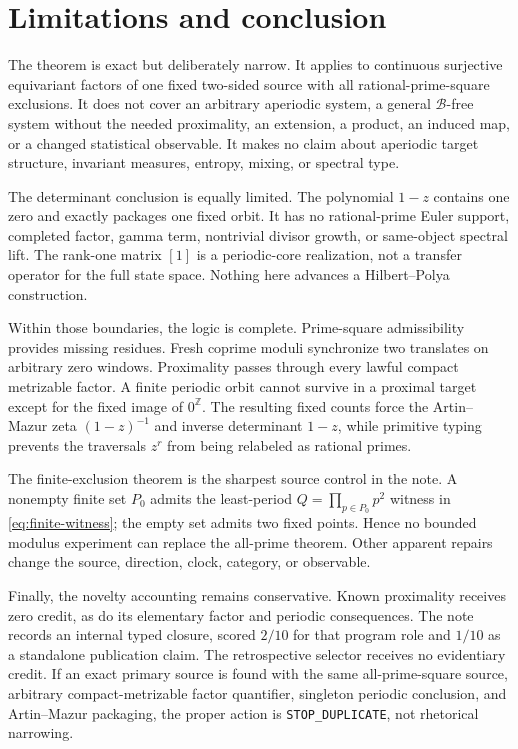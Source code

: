 \section{Limitations and conclusion}
\label{sec:limitations-conclusion}

The theorem is exact but deliberately narrow.  It applies to continuous
surjective equivariant factors of one fixed two-sided source with all
rational-prime-square exclusions.  It does not cover an arbitrary aperiodic
system, a general \(\mathscr B\)-free system without the needed proximality,
an extension, a product, an induced map, or a changed statistical observable.
It makes no claim about aperiodic target structure, invariant measures,
entropy, mixing, or spectral type.

The determinant conclusion is equally limited.  The polynomial \(1-z\)
contains one zero and exactly packages one fixed orbit.  It has no
rational-prime Euler support, completed factor, gamma term, nontrivial divisor
growth, or same-object spectral lift.  The rank-one matrix \([1]\) is a
periodic-core realization, not a transfer operator for the full state space.
Nothing here advances a Hilbert--Polya construction.

Within those boundaries, the logic is complete.  Prime-square admissibility
provides missing residues.  Fresh coprime moduli synchronize two translates
on arbitrary zero windows.  Proximality passes through every lawful compact
metrizable factor.  A finite periodic orbit cannot survive in a proximal
target except for the fixed image of \(0^{\mathbb Z}\).  The resulting fixed
counts force the Artin--Mazur zeta \((1-z)^{-1}\) and inverse determinant
\(1-z\), while primitive typing prevents the traversals \(z^r\) from being
relabeled as rational primes.

The finite-exclusion theorem is the sharpest source control in the note.  A
nonempty finite set \(P_0\) admits the least-period
\(Q=\prod_{p\in P_0}p^2\) witness in \cref{eq:finite-witness}; the empty set
admits two fixed points.  Hence no bounded modulus experiment can replace the
all-prime theorem.  Other apparent repairs change the source, direction,
clock, category, or observable.

Finally, the novelty accounting remains conservative.  Known proximality
receives zero credit, as do its elementary factor and periodic consequences.
The note records an internal typed closure, scored \(2/10\) for that program
role and \(1/10\) as a standalone publication claim.  The retrospective
selector receives no evidentiary credit.  If an exact primary source is found
with the same all-prime-square source, arbitrary compact-metrizable factor
quantifier, singleton periodic conclusion, and Artin--Mazur packaging, the
proper action is \texttt{STOP\_DUPLICATE}, not rhetorical narrowing.

